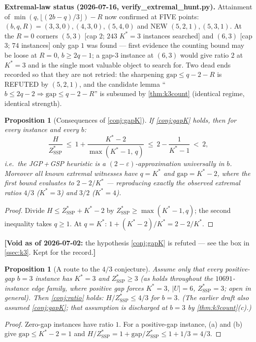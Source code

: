 \documentclass[11pt,a4paper]{article}
\theoremstyle{plain}
\newtheorem{proposition}[theorem]{Proposition}
\theoremstyle{definition}
\newcommand{\Kstar}{K^{*}}
\newcommand{\ZSSP}{Z_{\mathrm{SSP}}^{*}}
\begin{document}
\begin{warnbox}
\textbf{Extremal-law status (2026-07-16, verify\_extremal\_hunt.py).}
Attainment of $\min(q,\lfloor(2b-q)/3\rfloor)-R$ now confirmed at FIVE points:
$(b,q,R)=(3,3,0),(4,3,0),(5,4,0)$ and NEW $(5,2,1),(5,3,1)$. At the $R=0$
corners $(5,3)$ [cap $2$; $243$ $\Kstar{=}3$ instances searched] and $(6,3)$
[cap $3$; $74$ instances] only gap $1$ was found --- first evidence the
counting bound may be loose at $R=0$, $b\ge2q-1$; a gap-$3$ instance at
$(6,3)$ would give ratio $2$ at $\Kstar=3$ and is the single most valuable
object to search for. Two dead ends recorded so that they are not retried:
the sharpening $\mathrm{gap}\le q-2-R$ is REFUTED by $(5,2,1)$, and the
candidate lemma ``$b\le2q-2\Rightarrow\mathrm{gap}\le q-2-R$'' is subsumed by
\cref{thm:k3count} (identical regime, identical strength).
\end{warnbox}

\begin{thmbox}
\begin{proposition}[Consequences of \cref{conj:gapK}]
\label{prop:conj_consequences}
If \cref{conj:gapK} holds, then for every instance and every $b$:
\[
  \frac{H}{\ZSSP}\ \le\ 1+\frac{\Kstar-2}{\max(\Kstar-1,\,q)}
  \ \le\ 2-\frac{1}{\Kstar-1}\ <\ 2 ,
\]
i.e.\ the JGP\,+\,GSP heuristic is a $(2-\varepsilon)$-approximation \emph{universally in
$b$}. Moreover all known extremal witnesses have $q=\Kstar$ and
$\mathrm{gap}=\Kstar-2$, where the first bound evaluates to $2-2/\Kstar$ ---
reproducing exactly the observed extremal ratios $4/3$ ($\Kstar{=}3$) and
$3/2$ ($\Kstar{=}4$).
\end{proposition}
\end{thmbox}
\begin{proofbox}
\begin{proof}
Divide $H\le\ZSSP+\Kstar-2$ by $\ZSSP\ge\max(\Kstar-1,q)$; the second inequality takes
$q\ge1$. At $q=\Kstar$: $1+(\Kstar-2)/\Kstar=2-2/\Kstar$.
\end{proof}
\end{proofbox}
\noindent\textbf{[Void as of 2026-07-02:} the hypothesis \cref{conj:gapK} is
refuted --- see the box in \cref{ssec:k3}. Kept for the record.\textbf{]}

\begin{thmbox}
\begin{proposition}[A route to the $4/3$ conjecture]
\label{prop:43route}
Assume only that every positive-gap $b=3$ instance has $\Kstar=3$ and
$\ZSSP\ge3$ (as holds throughout the $10691$-instance edge family, where positive gap
forces $\Kstar=3$, $|U|=6$, $\ZSSP=3$; open in general). Then \cref{conj:ratio} holds:
$H/\ZSSP\le4/3$ for $b=3$. (The earlier draft also assumed \cref{conj:gapK}; that
assumption is discharged at $b=3$ by \cref{thm:k3count}(c).)
\end{proposition}
\end{thmbox}
\begin{proofbox}
\begin{proof}
Zero-gap instances have ratio $1$. For a positive-gap instance, (a) and (b) give
$\mathrm{gap}\le\Kstar-2=1$ and $H/\ZSSP=1+\mathrm{gap}/\ZSSP\le1+1/3=4/3$.
\end{proof}
\end{proofbox}
\end{document}
